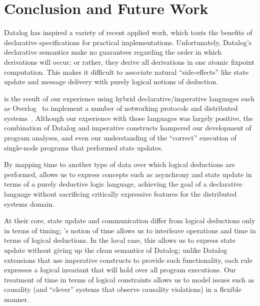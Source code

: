 \section{Conclusion and Future Work}

Datalog has inspired a variety of recent applied work, which touts the benefits of declarative specifications for practical implementations.  Unfortunately, Datalog's declarative semantics make no guarantees
regarding the order in which derivations will occur; or rather, they derive all derivations in one atomic fixpoint computation.  This makes it difficult to associate natural ``side-effects'' like state update and message delivery with purely logical notions of deduction.


\lang is the result of our experience using hybrid
declarative/imperative languages such as Overlog~\cite{Loo2009-CACM}
to implement a number of networking protocols and distributed
systems~\cite{boom-techr,Alvaro2009I-Do-Declare:-C,Chu:2007,Loo2009-CACM}.
Although our experience with those languages was largely positive, the
combination of Datalog and imperative constructs hampered our
development of program analyses, and even our understanding of the
``correct'' execution of single-node programs that performed state
updates.

By mapping time to another type of data over which logical deductions
are performed, \lang allows us to express concepts such as asynchrony and state update in terms of a purely deductive logic
language, achieving the goal of a declarative language without sacrificing critically expressive features for the distributed systems domain.

At their core, state update and communication differ from logical
deductions only in terms of timing; \lang's notion of time allows us
to interleave operations and time in terms of logical deductions.
In the local case, this allows us to express state update without giving up the clean semantics of Datalog; unlike
Datalog extensions that use imperative constructs to provide such
functionality, each \lang rule expresses a logical invariant that will
hold over all program executions.  
Our treatment of time in terms of
logical constraints allows us to model issues such as causality (and
``clever'' systems that observe causality violations) in a flexible
manner.

